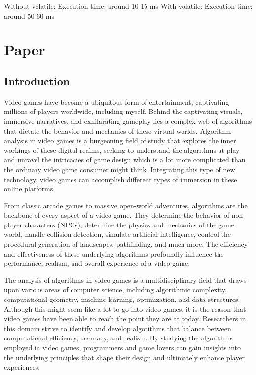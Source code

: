 \documentclass{article}
\theoremstyle{theorem}
\theoremstyle{definition}
\theoremstyle{remark}
\begin{document}
\medskip\noindent
Without volatile: Execution time: around 10-15 ms
With volatile: Execution time: around 50-60 ms



\section{Paper}

\subsection{Introduction}

\medskip\indent
Video games have become a ubiquitous form of entertainment, captivating millions of players worldwide, including myself. Behind the captivating visuals, immersive narratives, and exhilarating gameplay lies a complex web of algorithms that dictate the behavior and mechanics of these virtual worlds. Algorithm analysis in video games is a burgeoning field of study that explores the inner workings of these digital realms, seeking to understand the algorithms at play and unravel the intricacies of game design which is a lot more complicated than the ordinary video game consumer might think. Integrating this type of new technology, video games can accomplish different types of immersion in these online platforms.

\medskip\indent
From classic arcade games to massive open-world adventures, algorithms are the backbone of every aspect of a video game. They determine the behavior of non-player characters (NPCs), determine the physics and mechanics of the game world, handle collision detection, simulate artificial intelligence, control the procedural generation of landscapes, pathfinding, and much more. The efficiency and effectiveness of these underlying algorithms profoundly influence the performance, realism, and overall experience of a video game.

\medskip\indent
The analysis of algorithms in video games is a multidisciplinary field that draws upon various areas of computer science, including algorithmic complexity, computational geometry, machine learning, optimization, and data structures. Although this might seem like a lot to go into video games, it is the reason that video games have been able to reach the point they are at today. Researchers in this domain strive to identify and develop algorithms that balance between computational efficiency, accuracy, and realism. By studying the algorithms employed in video games, programmers and game lovers can gain insights into the underlying principles that shape their design and ultimately enhance player experiences.
\end{document}
